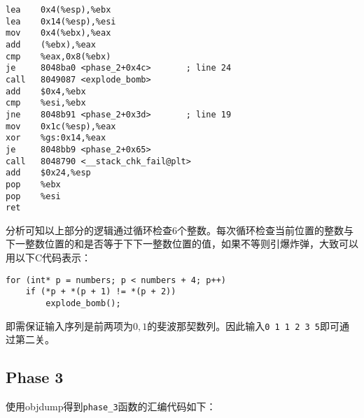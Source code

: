 \documentclass[a4paper, 11pt]{ctexart}
\begin{document}
\begin{verbatim}
lea    0x4(%esp),%ebx
lea    0x14(%esp),%esi
mov    0x4(%ebx),%eax
add    (%ebx),%eax
cmp    %eax,0x8(%ebx)
je     8048ba0 <phase_2+0x4c>       ; line 24
call   8049087 <explode_bomb>
add    $0x4,%ebx
cmp    %esi,%ebx
jne    8048b91 <phase_2+0x3d>       ; line 19
mov    0x1c(%esp),%eax
xor    %gs:0x14,%eax
je     8048bb9 <phase_2+0x65>
call   8048790 <__stack_chk_fail@plt>
add    $0x24,%esp
pop    %ebx
pop    %esi
ret
\end{verbatim}

分析可知以上部分的逻辑通过循环检查6个整数。每次循环检查当前位置的整数与下一整数位置的和是否等于下下一整数位置的值，如果不等则引爆炸弹，大致可以用以下C代码表示：

\begin{samepage}
\begin{verbatim}
for (int* p = numbers; p < numbers + 4; p++)
    if (*p + *(p + 1) != *(p + 2))
        explode_bomb();
\end{verbatim}
\end{samepage}

即需保证输入序列是前两项为$0, 1$的斐波那契数列。因此输入\texttt{0 1 1 2 3 5}即可通过第二关。

\subsection{Phase 3}
\label{ssc:phase3}
使用objdump得到\texttt{phase\_3}函数的汇编代码如下：
\end{document}
